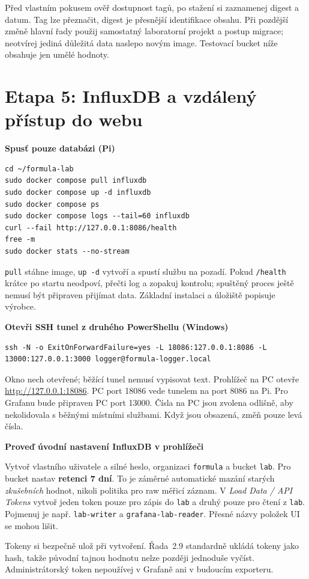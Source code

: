 \documentclass[11pt,a4paper]{article}
\newcommand{\krok}[1]{\par\noindent\textbf{#1}\par}
\begin{document}
Před vlastním pokusem ověř dostupnost tagů, po stažení si zaznamenej digest a datum. Tag lze přeznačit, digest je přesnější identifikace obsahu. Při pozdější změně hlavní řady použij samostatný laboratorní projekt a postup migrace; neotvírej jediná důležitá data naslepo novým image. Testovací bucket níže obsahuje jen umělé hodnoty.

\clearpage
\section{Etapa 5: InfluxDB a vzdálený přístup do webu}
\krok{Spusť pouze databázi (Pi)}
\begin{lstlisting}
cd ~/formula-lab
sudo docker compose pull influxdb
sudo docker compose up -d influxdb
sudo docker compose ps
sudo docker compose logs --tail=60 influxdb
curl --fail http://127.0.0.1:8086/health
free -m
sudo docker stats --no-stream
\end{lstlisting}
\texttt{pull} stáhne image, \texttt{up -d} vytvoří a spustí službu na pozadí. Pokud \texttt{/health} krátce po startu neodpoví, přečti log a zopakuj kontrolu; spuštěný proces ještě nemusí být připraven přijímat data. Základní instalaci a úložiště popisuje výrobce.\cite{influx-compose}

\krok{Otevři SSH tunel z druhého PowerShellu (Windows)}
\begin{lstlisting}
ssh -N -o ExitOnForwardFailure=yes -L 18086:127.0.0.1:8086 -L 13000:127.0.0.1:3000 logger@formula-logger.local
\end{lstlisting}
Okno nech otevřené; běžící tunel nemusí vypisovat text. Prohlížeč na PC otevře \url{http://127.0.0.1:18086}. PC port 18086 vede tunelem na port 8086 na Pi. Pro Grafanu bude připraven PC port 13000. Čísla na PC jsou zvolena odlišně, aby nekolidovala s běžnými místními službami. Když jsou obsazená, změň pouze levá čísla.\cite{openssh}

\krok{Proveď úvodní nastavení InfluxDB v prohlížeči}
Vytvoř vlastního uživatele a silné heslo, organizaci \texttt{formula} a bucket \texttt{lab}. Pro bucket nastav \textbf{retenci 7 dní}. To je záměrné automatické mazání starých \emph{zkušebních} hodnot, nikoli politika pro raw měřicí záznam. V \emph{Load Data / API Tokens} vytvoř jeden token pouze pro zápis do \texttt{lab} a druhý pouze pro čtení z \texttt{lab}. Pojmenuj je např. \texttt{lab-writer} a \texttt{grafana-lab-reader}. Přesné názvy položek UI se mohou lišit.\cite{influx-token}

Tokeny si bezpečně ulož při vytvoření. Řada~2.9 standardně ukládá tokeny jako hash, takže původní tajnou hodnotu nelze později jednoduše vyčíst. Administrátorský token nepoužívej v Grafaně ani v budoucím exporteru.\cite{influx-api}
\end{document}
